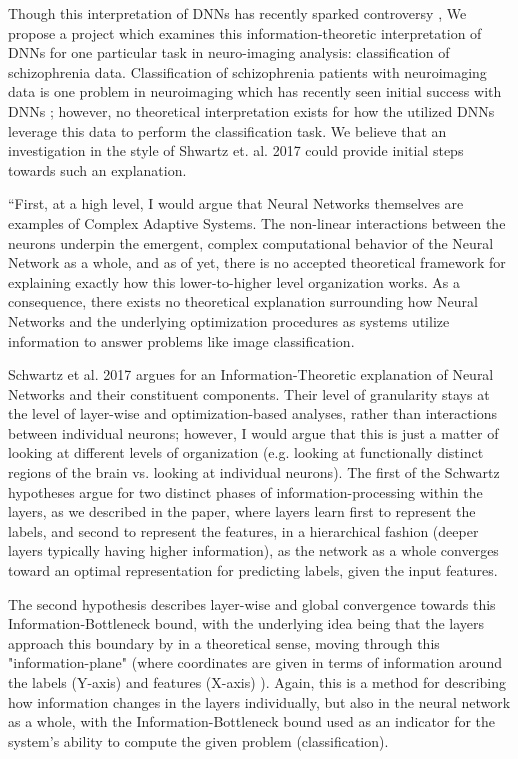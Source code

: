 \documentclass[conference, 5pt]{IEEEtran}
\begin{document}
Though this interpretation of DNNs has recently sparked controversy \cite{saxe2018information,amjad2018information}, We propose a project which examines this information-theoretic interpretation of DNNs for one particular task in neuro-imaging analysis: classification of schizophrenia data. Classification of schizophrenia patients with neuroimaging data is one problem in neuroimaging which has recently seen initial success with DNNs \cite{plis2014deep,kim2016deep,han2017schizophrenia}; however, no theoretical interpretation exists for how the utilized DNNs leverage this data to perform the classification task. We believe that an investigation in the style of Shwartz et. al. 2017 \cite{shwartz2017opening} could provide initial steps towards such an explanation. 

``First, at a high level, I would argue that Neural Networks themselves are examples of Complex Adaptive Systems. The non-linear interactions between the neurons underpin the emergent, complex computational behavior of the Neural Network as a whole, and as of yet, there is no accepted theoretical framework for explaining exactly how this lower-to-higher level organization works. As a consequence, there exists no theoretical explanation surrounding how Neural Networks and the underlying optimization procedures as systems utilize information to answer problems like image classification. 

Schwartz et al. 2017 argues for an Information-Theoretic explanation of Neural Networks and their constituent components. Their level of granularity stays at the level of layer-wise and optimization-based analyses, rather than interactions between individual neurons; however, I would argue that this is just a matter of looking at different levels of organization (e.g. looking at functionally distinct regions of the brain vs. looking at individual neurons). The first of the Schwartz hypotheses argue for two distinct phases of information-processing within the layers, as we described in the paper, where layers learn first to represent the labels, and second to represent the features, in a hierarchical fashion (deeper layers typically having higher information), as the network as a whole converges toward an optimal representation for predicting labels, given the input features. 

The second hypothesis describes layer-wise and global convergence towards this Information-Bottleneck bound, with the underlying idea being that the layers approach this boundary by in a theoretical sense, moving through this "information-plane" (where coordinates are given in terms of information around the labels (Y-axis) and features (X-axis) ). Again, this is a method for describing how information changes in the layers individually, but also in the neural network as a whole, with the Information-Bottleneck bound used as an indicator for the system's ability to compute the given problem (classification).
\end{document}
